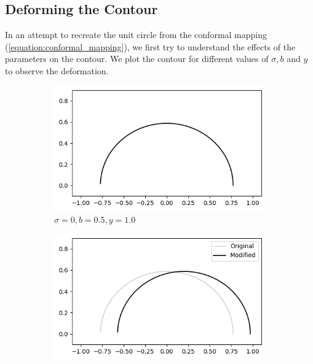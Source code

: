 \documentclass[a4paper]{report}
\begin{document}
\subsection{Deforming the Contour}
In an attempt to recreate the unit circle from the conformal mapping (\ref{equation:conformal_mapping}), we first try to understand the effects of the parameters on the contour. We plot the contour for different values of $\sigma, b$ and $y$ to observe the deformation.

\begin{figure}[ht]
    \begin{subfigure}{.3\linewidth}
      \includegraphics[width=\linewidth]{images/deformations/base.png}
      \caption{$\sigma = 0, b = 0.5, y = 1.0$}
      \label{fig:base_deform}
    \end{subfigure}\hfill
    \begin{subfigure}{.3\linewidth}
      \includegraphics[width=\linewidth]{images/deformations/positive_sigma.png}

\end{subfigure}
\end{figure}
\end{document}
